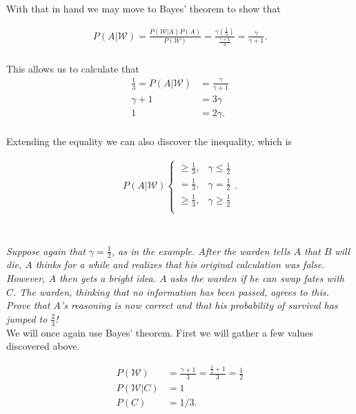 \documentclass[12pt]{amsart}
\begin{document}
	With that in hand we may move to Bayes' theorem to show that
	
	\begin{align*}
		P(A|\mathcal W) = \frac{P(\mathcal W|A)P(A)}{P(\mathcal W)}
		= \frac{\gamma \left( \frac{1}{3} \right)}{\frac{\gamma+1}{3}}
		= \frac{\gamma}{\gamma+1}. \\
	\end{align*}
	
	This allows us to calculate that
	\begin{align*}
		\frac 1 3
		= P(A|\mathcal W) 
		&= \frac{\gamma}{\gamma+1} \\
		\gamma+1 &= 3\gamma \\
		1 &= 2\gamma. \\			
	\end{align*}
	
	Extending the equality we can also discover the inequality, which is
	
	\begin{align*}
		P(A|\mathcal W)  
		\begin{cases}
			\geq\frac{1}{3} ,& \gamma \leq \frac 1 2 \\
			=\frac 1 3 ,& \gamma = \frac 1 2 \\
			\geq\frac{1}{3} ,& \gamma \geq \frac 1 2 \\
		\end{cases}.
	\end{align*} \\

	
	\subsubsection{}
	\textit{Suppose again that \(\gamma = \frac 1 2\), as in the example. After the warden tells \(A\) that \(B\)
		will die, \(A\) thinks for a while and realizes that his original calculation was false.
		However, \(A\) then gets a bright idea. \(A\) asks the warden if he can swap fates with \(C\).
		The warden, thinking that no information has been passed, agrees to this. Prove
		that \(A\)’s reasoning is now correct and that his probability of survival has jumped to \(\frac 2 3\)!} \\
	
	We will once again use Bayes' theorem. First we will gather a few values discovered above.
	
	\begin{align*}
	P(\mathcal W) &= \frac{\gamma+1}{3} = \frac{\frac{1}{2}+1}{3} = \frac{1}{2} \\
	P(\mathcal W|C) &= 1 \\
	P(C) &= 1/3.	\\
	\end{align*}
	
\end{document}
